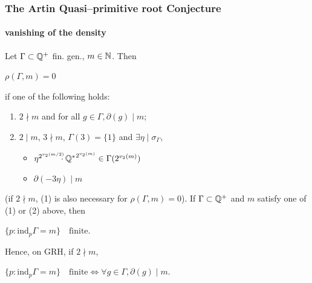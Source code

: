 \documentclass[10pt,handout]{beamer} %
\begin{document}
 
\begin{frame}
\frametitle{The Artin Quasi--primitive root Conjecture}
\framesubtitle{vanishing of the density}

\begin{Theorem}\label{finite} Let $\Gamma\subset\mathbb Q^+$ fin. gen.,  $m\in\mathbb N$. Then
\\
\centerline{$\rho(\Gamma,m)=0$}

if one of the following holds:
\begin{enumerate}
 \item $2\nmid m$ and for all $g\in\Gamma, \partial(g)\mid m$;
 \item $2\mid m$, $3\nmid m$, $\Gamma(3)=\{1\}$ and $\exists \eta\mid\sigma_\Gamma,$
\hspace*{4cm} \begin{minipage}{5cm}\begin{itemize}
 \item $\eta^{2^{v_2(m/2)}}\!\!\!\!\cdot{\mathbb Q^*}^{2^{v_2(m)}}\in\Gamma(2^{v_2(m)})$
 \item $\partial(-3\eta)\mid m$ %
 \end{itemize}\end{minipage}
 \end{enumerate}
(if $2\nmid m$, (1) is also necessary for $\rho(\Gamma,m)=0$).
If $\Gamma\subset\mathbb Q^+$ and $m$ satisfy one of (1) or (2) above, then\\
\centerline{$\{p: \text{ind}_p\Gamma=m\}\quad\text{finite}.$}

Hence, on GRH, if $2\nmid m$,\\
\centerline{$\{p: \text{ind}_p\Gamma=m\}\quad\text{finite} \Longleftrightarrow \forall g\in\Gamma, \partial(g)\mid m.$}
\end{Theorem}
\end{frame}
\end{document}
